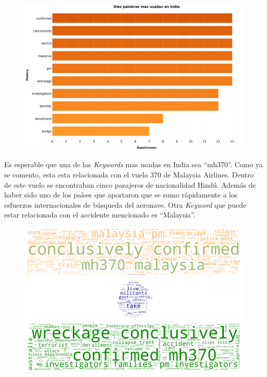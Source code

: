 \documentclass[titlepage,a4paper]{article}
\begin{document}
    \begin{figure}[H]
    \centering
    \includegraphics[width=1\textwidth]{graficos/Analisis de Locacion/10_palabras_mas_usadas_india.png}
    \caption{}
    \end{figure}
    
    Es esperable que una de las \textit{Keywords} mas usadas en India sea ``mh370''. Como ya se comento, esta esta relacionada con el vuelo 370 de Malaysia Airlines. Dentro de este vuelo se encontraban cinco pasajeros de nacionalidad Hindú. Además de haber sido uno de los países que aportaron que se sumo rápidamente a los esfuerzos internacionales de búsqueda del aeronave. Otra \textit{Keyword} que puede estar relacionada con el accidente mencionado es ``Malaysia''.
    
    \begin{figure}[H]
    \centering
    \includegraphics[width=1\textwidth]{graficos/Analisis de Locacion/bandera_india.png}
    \caption{}
    \end{figure}
    
\end{document}
